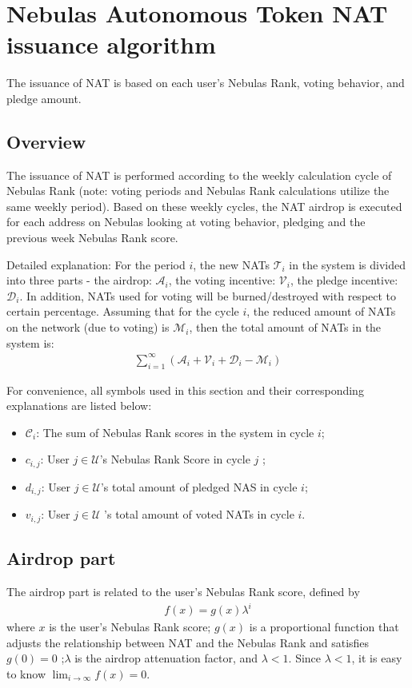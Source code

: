 \section{Nebulas Autonomous Token NAT issuance algorithm}

The issuance of NAT is based on each user's Nebulas Rank, voting behavior, and pledge amount.

\subsection{Overview}
The issuance of NAT is performed according to the weekly calculation cycle of Nebulas Rank (note: voting periods and Nebulas Rank calculations utilize the same weekly period). Based on these weekly cycles, the NAT airdrop is executed for each address on Nebulas looking at voting behavior, pledging and the previous week Nebulas Rank score.

Detailed explanation: 
For the period $i$, the new NATs $\mathcal{T}_i$ in the system is divided into three parts - the airdrop: $\mathcal{A}_i$, the voting incentive: $\mathcal{V}_i$, the pledge incentive: $\mathcal{D}_i$.
In addition, NATs used for voting will be burned/destroyed with respect to certain percentage. Assuming that for the cycle $i$, the reduced amount of NATs on the network (due to voting) is $\mathcal{M}_i$, then the total amount of NATs in the system is:
\begin{align}
\sum_{i=1}^{\infty} (\mathcal{A}_i + \mathcal{V}_i + \mathcal{D}_i - \mathcal{M}_i)
\end{align}

For convenience, all symbols used in this section and their corresponding explanations are listed below:
\begin{itemize}
\item $\mathcal{C}_i$: The sum of Nebulas Rank scores in the system in  cycle $i$;
\item $c_{i,j}$: User $j \in \mathcal{U}$'s Nebulas Rank Score in cycle $j$ ;
\item $d_{i,j}$: User $j \in \mathcal{U}$'s total amount of pledged NAS in cycle $i$;
\item $v_{i,j}$: User $j \in \mathcal{U}$ 's total amount of voted NATs in cycle $i$.
\end{itemize}

\subsection{Airdrop part}
The airdrop part is related to the user's Nebulas Rank score, defined by 
\begin{align}
    f(x) = g(x)\lambda^i
\end{align}
\noindent where $x$ is the user's Nebulas Rank score; $g(x)$ is a proportional function that adjusts the relationship between NAT and the Nebulas Rank and satisfies $g(0) = 0$ ;$\lambda$ is the airdrop attenuation factor, and $\lambda < 1$.
Since $\lambda < 1$, it is easy to know $\lim_{i\to \infty}f(x) = 0$.

